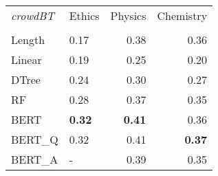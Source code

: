 \begin{tabular}{llrr}
\toprule
\textit{crowdBT} & Ethics &  Physics &  Chemistry \\
  &        &          &            \\
\midrule
Length &   0.17 &     0.38 &       0.36 \\
Linear &   0.19 &     0.25 &       0.20 \\
DTree  &   0.24 &     0.30 &       0.27 \\
RF     &   0.28 &     0.37 &       0.35 \\
BERT   &   \textbf{0.32} &     \textbf{0.41} &       0.36 \\
BERT\_Q &   0.32 &     0.41 &       \textbf{0.37} \\
BERT\_A &      - &     0.39 &       0.35 \\
\bottomrule
\end{tabular}
